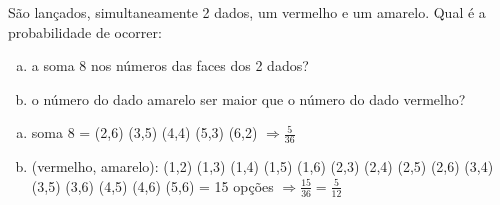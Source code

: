 \begin{ex}
São lançados, simultaneamente 2 dados, um vermelho e um amarelo. Qual é a probabilidade de ocorrer:
   \begin{enumerate}[(a)]
   \item a soma 8 nos números das faces dos 2 dados?
   \item o número do dado amarelo ser maior que o número do dado vermelho?
   \end{enumerate}
      \begin{sol}
        \phantom{A}
      \begin{enumerate} [(a)]
          \item soma 8 = (2,6) (3,5) (4,4) (5,3) (6,2) $\Longrightarrow  \frac{5}{36}$
          \item (vermelho, amarelo): (1,2) (1,3) (1,4) (1,5) (1,6) (2,3) (2,4) (2,5) (2,6) (3,4) (3,5) (3,6) (4,5) (4,6) (5,6) = 15 opções $\Longrightarrow \frac{15}{36}=\frac{5}{12}$
      \end{enumerate}
      \end{sol}
\end{ex}
